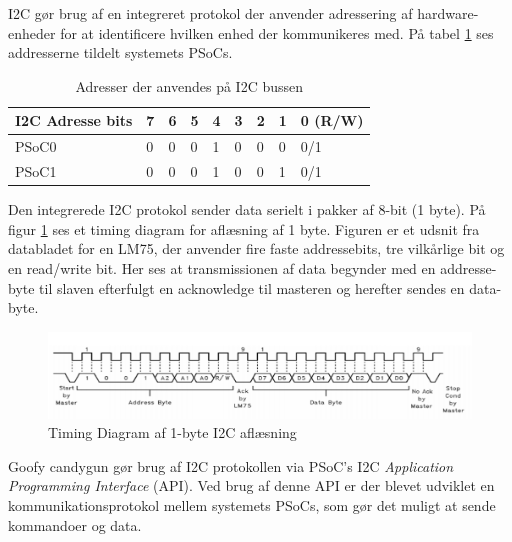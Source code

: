 I2C gør brug af en integreret protokol der anvender adressering af hardware-enheder for at identificere hvilken enhed der kommunikeres med. På tabel \ref{table:I2CAddress} ses addresserne tildelt systemets PSoCs.

\begin{table}[H]
	\centering
	\begin{tabular}{lllllllll}
		\hline
		\multicolumn{1}{|l|}{I2C Adresse bits} & 7                        & 6                        & 5                        & 4 & 3 & 2 & \multicolumn{1}{l|}{1} & \multicolumn{1}{l|}{0 (R/W)} \\ \hline
		\rowcolor[HTML]{CBCEFB} 
		{\color[HTML]{000000} PSoC0}           & {\color[HTML]{000000} 0} & {\color[HTML]{000000} 0} & {\color[HTML]{000000} 0} & 1 & 0 & 0 & 0                      & 0/1                          \\
		PSoC1                                  & 0                        & 0                        & 0                        & 1 & 0 & 0 & 1                      & 0/1                         
	\end{tabular}
	\caption{Adresser der anvendes på I2C bussen}
	\label{table:I2CAddress}
\end{table}

Den integrerede I2C protokol sender data serielt i pakker af 8-bit (1 byte). På figur \ref{fig:I2CTimingDiagram} ses et timing diagram for aflæsning af 1 byte. Figuren er et udsnit fra databladet for en LM75, der anvender fire faste addressebits, tre vilkårlige bit og en read/write bit. Her ses at transmissionen af data begynder med en addresse-byte til slaven efterfulgt en acknowledge til masteren og herefter sendes en data-byte. 

\begin{figure}[H]
	\centering
	\includegraphics[width=\textwidth] {Systemarkitektur/images/I2CTimingDiagram}
	\caption{Timing Diagram af 1-byte I2C aflæsning}
	\label{fig:I2CTimingDiagram}
\end{figure}

Goofy candygun gør brug af I2C protokollen via PSoC's I2C \textit{Application Programming Interface} (API). Ved brug af denne API er der blevet udviklet en kommunikationsprotokol mellem systemets PSoCs, som gør det muligt at sende kommandoer og data.


